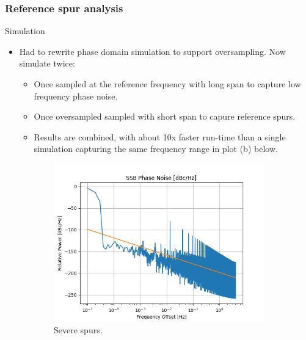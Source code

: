 \documentclass[t, screen, aspectratio=43]{beamer}
\begin{document}
\begin{frame}
	\frametitle{Reference spur analysis}
	\begin{block}{Simulation}
		\begin{itemize}
			\scriptsize
			\item Had to rewrite phase domain simulation to support oversampling. Now simulate twice:
			\begin{itemize}
				\tiny
				\item Once sampled at the reference frequency with long span to capture low frequency phase noise.
				\item Once oversampled sampled with short span to capure reference spurs.
				\item Results are combined, with about 10x faster run-time than a single simulation capturing the same frequency range in plot (b) below.
			\end{itemize} 
		\end{itemize} 
		\vspace{-1em}
		\begin{figure}[htb!]
	        \centering
	        \begin{subfigure}{.4\textwidth}
	            \centering
	            \includegraphics[width=0.9\linewidth]{pn_spurs.png}
	            \caption{\scriptsize Severe spurs.}
	            \label{fig:rosc_3stg_cir}
	        \end{subfigure}%
	        \begin{subfigure}{.4\textwidth}
	            \centering

\end{subfigure}
\end{figure}
\end{block}
\end{frame}
\end{document}
